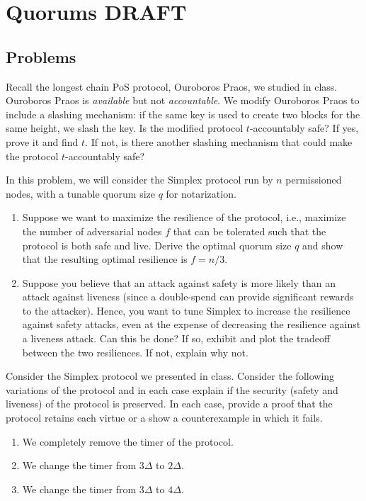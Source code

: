 \chapter{Quorums \small{\textsf{DRAFT}}}\label{chapter.quorums}

\section*{Problems}
\begin{problems}
    \item Recall the longest chain PoS protocol, Ouroboros Praos, we studied in class.
        Ouroboros Praos is \emph{available} but not \emph{accountable}. We modify Ouroboros Praos to
        include a slashing mechanism: if the same key is used to create two blocks for
        the same height, we slash the key. Is the modified protocol $t$-accountably
        safe? If yes, prove it and find $t$. If not, is there another slashing mechanism
        that could make the protocol $t$-accountably safe?
    
    \item In this problem, we will consider the Simplex protocol run by $n$ permissioned
        nodes, with a tunable quorum size $q$ for notarization.
        \begin{enumerate}
            \item Suppose we want to maximize the resilience of the protocol, i.e.,
            maximize the number of adversarial nodes $f$ that can be tolerated such
            that the protocol is both safe and live. Derive the optimal quorum size
            $q$ and show that the resulting optimal resilience is $f = n/3$.
            \item Suppose you believe that an attack against safety is more likely than
            an attack against liveness (since a double-spend can provide significant
            rewards to the attacker). Hence, you want to tune Simplex to increase the
            resilience against safety attacks, even at the expense of decreasing the
            resilience against a liveness attack. Can this be done? If so, exhibit and
            plot the tradeoff between the two resiliences. If not, explain why not.
        \end{enumerate}
    
    \item Consider the Simplex protocol we presented in class. Consider the following
        variations of the protocol and in each case explain if the security (safety and
        liveness) of the protocol is preserved. In each case, provide a proof that the
        protocol retains each virtue or a show a counterexample in which it fails.
        \begin{enumerate}
            \item We completely remove the timer of the protocol.
            \item We change the timer from $3\Delta$ to $2\Delta$.
            \item We change the timer from $3\Delta$ to $4\Delta$.
        \end{enumerate}


\end{problems}
